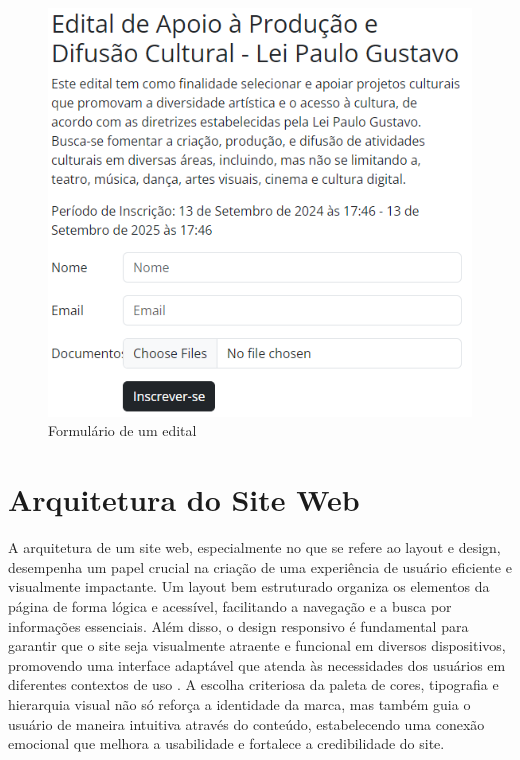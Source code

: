 \begin{figure}[htb]
	\caption{\label{fig_grafico}Formulário de um edital}
	\begin{center}
	    \includegraphics[scale=0.3]{./img/form_edital.png}
	\end{center}
\end{figure}

\section{Arquitetura do Site Web}

A arquitetura de um site web, especialmente no que se refere ao layout e design, desempenha um papel crucial na criação de uma experiência de usuário eficiente e visualmente impactante. Um layout bem estruturado organiza os elementos da página de forma lógica e acessível, facilitando a navegação e a busca por informações essenciais. Além disso, o design responsivo é fundamental para garantir que o site seja visualmente atraente e funcional em diversos dispositivos, promovendo uma interface adaptável que atenda às necessidades dos usuários em diferentes contextos de uso \cite{garrett2010elements}. A escolha criteriosa da paleta de cores, tipografia e hierarquia visual não só reforça a identidade da marca, mas também guia o usuário de maneira intuitiva através do conteúdo, estabelecendo uma conexão emocional que melhora a usabilidade e fortalece a credibilidade do site.

